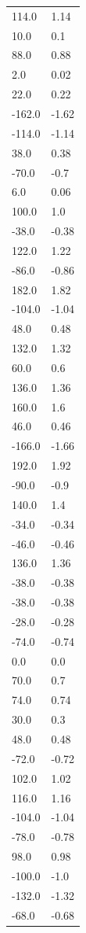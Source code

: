 \begin{longtable}{ll}
114.0 & 1.14 \\
10.0 & 0.1 \\
88.0 & 0.88 \\
2.0 & 0.02 \\
22.0 & 0.22 \\
-162.0 & -1.62 \\
-114.0 & -1.14 \\
38.0 & 0.38 \\
-70.0 & -0.7 \\
6.0 & 0.06 \\
100.0 & 1.0 \\
-38.0 & -0.38 \\
122.0 & 1.22 \\
-86.0 & -0.86 \\
182.0 & 1.82 \\
-104.0 & -1.04 \\
48.0 & 0.48 \\
132.0 & 1.32 \\
60.0 & 0.6 \\
136.0 & 1.36 \\
160.0 & 1.6 \\
46.0 & 0.46 \\
-166.0 & -1.66 \\
192.0 & 1.92 \\
-90.0 & -0.9 \\
140.0 & 1.4 \\
-34.0 & -0.34 \\
-46.0 & -0.46 \\
136.0 & 1.36 \\
-38.0 & -0.38 \\
-38.0 & -0.38 \\
-28.0 & -0.28 \\
-74.0 & -0.74 \\
0.0 & 0.0 \\
70.0 & 0.7 \\
74.0 & 0.74 \\
30.0 & 0.3 \\
48.0 & 0.48 \\
-72.0 & -0.72 \\
102.0 & 1.02 \\
116.0 & 1.16 \\
-104.0 & -1.04 \\
-78.0 & -0.78 \\
98.0 & 0.98 \\
-100.0 & -1.0 \\
-132.0 & -1.32 \\
-68.0 & -0.68 \\

\end{longtable}
